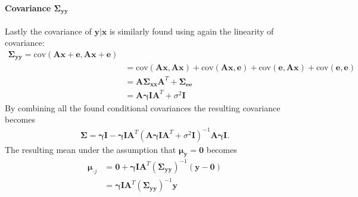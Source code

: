 \paragraph{Covariance $\boldsymbol{\Sigma}_{\mathbf{yy}}$}
Lastly the covariance of $\mathbf{y} \vert \mathbf{x}$ is similarly found using again the linearity of covariance:
\begin{align*}
\boldsymbol{\Sigma}_{\mathbf{yy}} = \text{cov} \left(\mathbf{Ax} + \mathbf{e} , \mathbf{Ax} + \mathbf{e} \right) \\ 
&= \text{cov}\left( \mathbf{Ax},\mathbf{Ax} \right) + \text{cov}\left(\mathbf{Ax},  \mathbf{e} \right) + \text{cov}\left( \mathbf{e}, \mathbf{Ax} \right) + \text{cov}\left( \mathbf{e}, \mathbf{e} \right)\\
&= \textbf{A}\boldsymbol{\Sigma}_{\mathbf{xx}}\textbf{A}^T + \boldsymbol{\Sigma}_{\mathbf{ee}} \\
&= \textbf{A}\boldsymbol{\gamma} \mathbf{I}\textbf{A}^T + \sigma^2 \mathbf{I}
\end{align*} 
By combining all the found conditional covariances the resulting covariance becomes 
\begin{align*}
\boldsymbol{\Sigma} = \boldsymbol{\gamma} \mathbf{I} - \boldsymbol{\gamma} \mathbf{I} \mathbf{A}^T (\textbf{A}\boldsymbol{\gamma} \mathbf{I}\textbf{A}^T + \sigma^2 \mathbf{I})^{-1} \mathbf{A} \boldsymbol{\gamma} \mathbf{I}.
\end{align*}
The resulting mean under the assumption that $\boldsymbol{\mu}_{\mathbf{y}} = \mathbf{0}$ becomes
\begin{align*}
\boldsymbol{\mu}_{\cdot j} &= \mathbf{0} + \boldsymbol{\gamma} \mathbf{I} \mathbf{A}^T \left( \boldsymbol{\Sigma}_{\mathbf{yy}} \right)^{-1} \left(\mathbf{y} - \mathbf{0}\right) \\
&= \boldsymbol{\gamma} \mathbf{I} \mathbf{A}^T \left( \boldsymbol{\Sigma}_{\mathbf{yy}} \right)^{-1} \mathbf{y}
\end{align*}  
